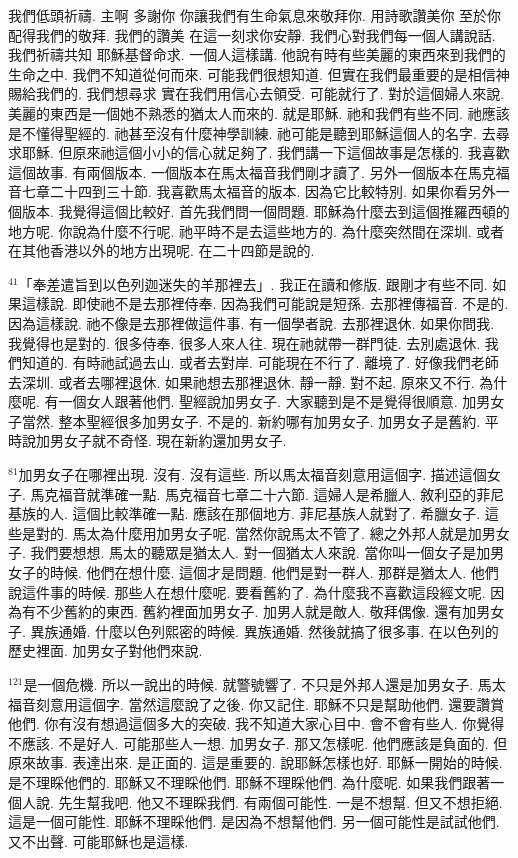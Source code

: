 \documentclass{book}
\begin{document}
我們低頭祈禱.
主啊 多謝你 你讓我們有生命氣息來敬拜你.
用詩歌讚美你 至於你配得我們的敬拜.
我們的讚美 在這一刻求你安靜.
我們心對我們每一個人講說話.
我們祈禱共知 耶穌基督命求.
一個人這樣講.
他說有時有些美麗的東西來到我們的生命之中.
我們不知道從何而來.
可能我們很想知道.
但實在我們最重要的是相信神賜給我們的.
我們想尋求 實在我們用信心去領受.
可能就行了.
對於這個婦人來說.
美麗的東西是一個她不熟悉的猶太人而來的.
就是耶穌.
祂和我們有些不同.
祂應該是不懂得聖經的.
祂甚至沒有什麼神學訓練.
祂可能是聽到耶穌這個人的名字.
去尋求耶穌.
但原來祂這個小小的信心就足夠了.
我們講一下這個故事是怎樣的.
我喜歡這個故事.
有兩個版本.
一個版本在馬太福音我們剛才讀了.
另外一個版本在馬克福音七章二十四到三十節.
我喜歡馬太福音的版本.
因為它比較特別.
如果你看另外一個版本.
我覺得這個比較好.
首先我們問一個問題.
耶穌為什麼去到這個推羅西頓的地方呢.
你說為什麼不行呢.
祂平時不是去這些地方的.
為什麼突然間在深圳.
或者在其他香港以外的地方出現呢.
在二十四節是說的.

$^{41}$「奉差遣旨到以色列迦迷失的羊那裡去」.
我正在讀和修版.
跟剛才有些不同.
如果這樣說.
即使祂不是去那裡侍奉.
因為我們可能說是短孫.
去那裡傳福音.
不是的.
因為這樣說.
祂不像是去那裡做這件事.
有一個學者說.
去那裡退休.
如果你問我.
我覺得也是對的.
很多侍奉.
很多人來人往.
現在祂就帶一群門徒.
去別處退休.
我們知道的.
有時祂試過去山.
或者去對岸.
可能現在不行了.
離境了.
好像我們老師去深圳.
或者去哪裡退休.
如果祂想去那裡退休.
靜一靜.
對不起.
原來又不行.
為什麼呢.
有一個女人跟著他們.
聖經說加男女子.
大家聽到是不是覺得很順意.
加男女子當然.
整本聖經很多加男女子.
不是的.
新約哪有加男女子.
加男女子是舊約.
平時說加男女子就不奇怪.
現在新約還加男女子.

$^{81}$加男女子在哪裡出現.
沒有.
沒有這些.
所以馬太福音刻意用這個字.
描述這個女子.
馬克福音就準確一點.
馬克福音七章二十六節.
這婦人是希臘人.
敘利亞的菲尼基族的人.
這個比較準確一點.
應該在那個地方.
菲尼基族人就對了.
希臘女子.
這些是對的.
馬太為什麼用加男女子呢.
當然你說馬太不管了.
總之外邦人就是加男女子.
我們要想想.
馬太的聽眾是猶太人.
對一個猶太人來說.
當你叫一個女子是加男女子的時候.
他們在想什麼.
這個才是問題.
他們是對一群人.
那群是猶太人.
他們說這件事的時候.
那些人在想什麼呢.
要看舊約了.
為什麼我不喜歡這段經文呢.
因為有不少舊約的東西.
舊約裡面加男女子.
加男人就是敵人.
敬拜偶像.
還有加男女子.
異族通婚.
什麼以色列熙密的時候.
異族通婚.
然後就搞了很多事.
在以色列的歷史裡面.
加男女子對他們來說.

$^{121}$是一個危機.
所以一說出的時候.
就警號響了.
不只是外邦人還是加男女子.
馬太福音刻意用這個字.
當然這麼說了之後.
你又記住.
耶穌不只是幫助他們.
還要讚賞他們.
你有沒有想過這個多大的突破.
我不知道大家心目中.
會不會有些人.
你覺得不應該.
不是好人.
可能那些人一想.
加男女子.
那又怎樣呢.
他們應該是負面的.
但原來故事.
表達出來.
是正面的.
這是重要的.
說耶穌怎樣也好.
耶穌一開始的時候.
是不理睬他們的.
耶穌又不理睬他們.
耶穌不理睬他們.
為什麼呢.
如果我們跟著一個人說.
先生幫我吧.
他又不理睬我們.
有兩個可能性.
一是不想幫.
但又不想拒絕.
這是一個可能性.
耶穌不理睬他們.
是因為不想幫他們.
另一個可能性是試試他們.
又不出聲.
可能耶穌也是這樣.
\end{document}
